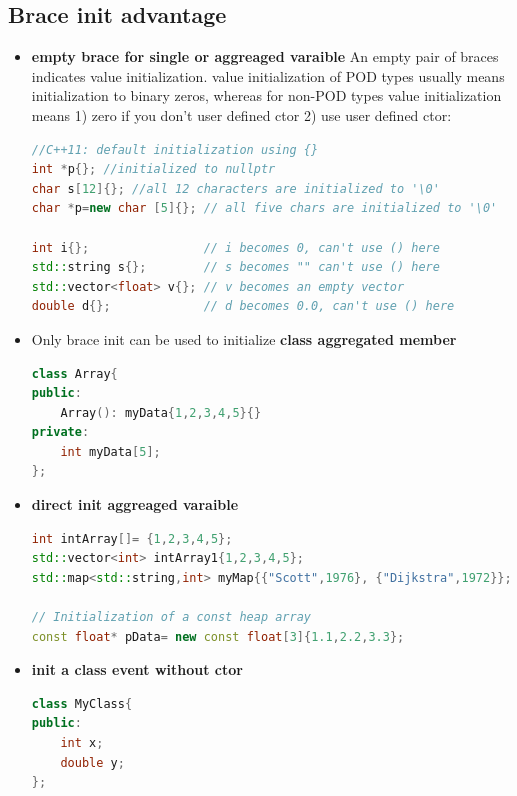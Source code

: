 \documentclass[a4paper,11pt,twoside]{book}
\begin{document}
\subsection{Brace init advantage}
\begin{itemize}
	\item \textbf{empty brace for single or aggreaged varaible} An empty pair of braces indicates value initialization. value initialization of POD types usually means initialization to binary zeros, whereas for non-POD types value initialization means 1) zero if you don't user defined ctor 2) use user defined ctor:

\begin{lstlisting}[frame=single, language=c++,mathescape=true]
//C++11: default initialization using {}
int *p{}; //initialized to nullptr
char s[12]{}; //all 12 characters are initialized to '\0'
char *p=new char [5]{}; // all five chars are initialized to '\0'
	
int i{};                // i becomes 0, can't use () here
std::string s{};        // s becomes "" can't use () here
std::vector<float> v{}; // v becomes an empty vector
double d{};             // d becomes 0.0, can't use () here
\end{lstlisting}
	
	\item Only brace init can be used to initialize \textbf{class aggregated member}

\begin{lstlisting}[frame=single, language=c++,mathescape=true]
class Array{
public:
	Array(): myData{1,2,3,4,5}{}    
private:
	int myData[5];
};
\end{lstlisting}

\item \textbf{direct init aggreaged varaible}
\begin{lstlisting}[frame=single, language=c++,mathescape=true]
int intArray[]= {1,2,3,4,5};   
std::vector<int> intArray1{1,2,3,4,5};  
std::map<std::string,int> myMap{{"Scott",1976}, {"Dijkstra",1972}};
	
// Initialization of a const heap array
const float* pData= new const float[3]{1.1,2.2,3.3};
\end{lstlisting}
	
\item \textbf{ init a class event without ctor}
\begin{lstlisting}[frame=single, language=c++,mathescape=true]
class MyClass{			
public: 
	int x;
	double y;
};
	

\end{lstlisting}
\end{itemize}
\end{document}
